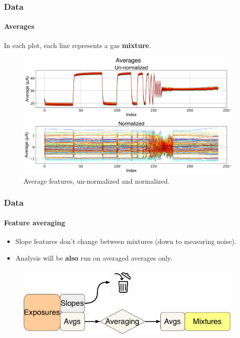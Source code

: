 \documentclass{beamer}
\begin{document}
\begin{frame}
		\frametitle{Data}
	\framesubtitle{Averages}
		In each plot, each line represents a gas \textbf{mixture}.
	\begin{figure}[b]
		\includegraphics[width=1\linewidth]{../../figures/averages.png}
		\caption{Average features, un-normalized and normalized.}
		\label{fig:averages}
	\end{figure}
\end{frame}

\begin{frame}
	\frametitle{Data}
	\framesubtitle{Feature averaging}
	
	\begin{itemize}
		\pause
		\item Slope features don't change between mixtures (down to measuring noise).
		\pause
		\item Analysis will be \textbf{also} run on averaged averages only.
	\end{itemize}

	\begin{figure}[b]
	\includegraphics[width=1\linewidth]{../../figures/exp-mix.pdf}
	\end{figure}

	
\end{frame}
		
\end{document}
